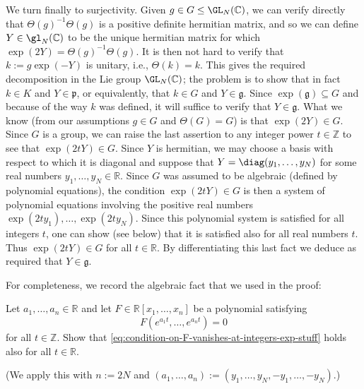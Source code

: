 \documentclass[reqno]{amsart} 
\begin{document}
We turn finally to surjectivity.  Given $g \in G \leq \GL_N(\mathbb{C})$, we can verify directly that $\Theta(g)^{-1} \Theta(g)$ is a positive definite hermitian matrix, and so we can define $Y \in \gl_N(\mathbb{C})$ to be the unique hermitian matrix for which $\exp(2 Y) = \Theta(g)^{-1} \Theta(g)$.  It is then not hard to verify that $k := g \exp(-Y)$ is unitary, i.e., $\Theta(k) = k$.  This gives the required decomposition in the Lie group $\GL_N(\mathbb{C})$; the problem is to show that in fact $k \in K$ and $Y \in \mathfrak{p}$, or equivalently, that $k \in G$ and $Y \in \mathfrak{g}$.  Since $\exp(\mathfrak{g}) \subseteq G$ and because of the way $k$ was defined, it will suffice to verify that $Y \in \mathfrak{g}$.  What we know (from our assumptions $g \in G$ and $\Theta(G) = G$) is that $\exp(2 Y) \in G$.  Since $G$ is a group, we can raise the last assertion to any integer power $t \in \mathbb{Z}$ to see that $\exp(2 t Y) \in G$.  Since $Y$ is hermitian, we may choose a basis with respect to which it is diagonal and suppose that $Y = \diag(y_1,\dotsc,y_N)$ for some real numbers $y_1,\dotsc,y_N \in \mathbb{R}$.  Since $G$ was assumed to be algebraic (defined by polynomial equations), the condition $\exp(2 t Y) \in G$ is then a system of polynomial equations involving the positive real numbers $\exp(2 t y_1), \dotsc, \exp(2 t y_N)$.  Since this polynomial system is satisfied for all integers $t$, one can show (see below) that it is satisfied also for all real numbers $t$.  Thus $\exp(2 t Y) \in G$ for all $t \in \mathbb{R}$.  By differentiating this last fact we deduce as required that $Y \in \mathfrak{g}$.

For completeness, we record the algebraic fact that we used in the proof:
\begin{exercise}
  Let $a_1,\dotsc,a_n \in \mathbb{R}$ and let $F \in \mathbb{R}[x_1,\dotsc,x_n]$ be a polynomial satisfying
  \begin{equation}\label{eq:condition-on-F-vanishes-at-integers-exp-stuff}
    F(e^{a_1 t},\dotsc,e^{a_n t})
    = 0
  \end{equation}
  for all $t \in \mathbb{Z}$.  Show that \eqref{eq:condition-on-F-vanishes-at-integers-exp-stuff} holds also for all $t \in \mathbb{R}$.
\end{exercise}
(We apply this with $n := 2 N$ and $(a_1,\dotsc,a_n) := (y_1,\dotsc,y_N,-y_1,\dotsc,-y_N)$.)
\end{document}

